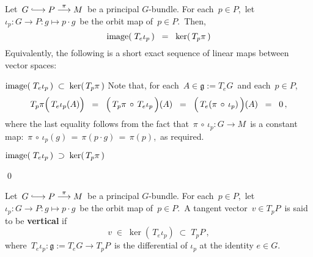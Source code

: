 
\vskip 0.5cm
\begin{proposition}
\mbox{}
\vskip 0.1cm
\noindent
Let \,$G \longhookrightarrow P \overset{\pi}{\longrightarrow} M$\, be a principal $G$-bundle.
For each \,$p \in P$,\, let \,$\iota_{p} : G \longrightarrow P : g \longmapsto p \cdot g$\, be the orbit map of \,$p \in P$.\,
Then,
\begin{equation*}
\textnormal{image}\!\left(\;T_{e}\iota_{p}\,\right) \;\; = \;\; \ker\!\left(\,T_{p}\pi\,\right)
\end{equation*}
Equivalently, the following is a short exact sequence of linear maps between vector spaces:
\begin{center}
\end{center}
\end{proposition}
\proof
\vskip 0.3cm
\noindent
\underline{$\textnormal{image}\!\left(\;T_{e}\iota_{p}\,\right) \;\subset\; \ker\!\left(\,T_{p}\pi\,\right)$}
\vskip 0.2cm
\noindent
Note that, for each \,$A \in \mathfrak{g} := T_{e}G$\, and each \,$p \in P$,\,
\begin{equation*}
T_{p}\pi\!\left(\,T_{e}\iota_{p}(\overset{{\color{white}.}}{A})\right)
\;\; = \;\;
	\left(\,T_{p}\pi \,\overset{{\color{white}1}}{\circ}\, T_{e}\iota_{p}\,\right)\!(A)
\;\; = \;\;
	\left(\,T_{e}(\pi\,\overset{{\color{white}1}}{\circ}\,\iota_{p})\,\right)\!(A)
\;\; = \;\;
	0\,,
\end{equation*}
where the last equality follows from the fact that
\,$\pi\,\circ\,\iota_{p} : G \longrightarrow M$\,
is a constant map:
\,$\pi\,\circ\,\iota_{p}(g) \,=\, \pi(p \cdot g) \,=\, \pi(p)$,\,
as required.

\vskip 0.3cm
\noindent
\underline{$\textnormal{image}\!\left(\;T_{e}\iota_{p}\,\right) \;\supset\; \ker\!\left(\,T_{p}\pi\,\right)$}
\vskip 0.2cm
\noindent


\qed


\vskip 0.5cm
\begin{definition}
\mbox{}
\vskip 0.1cm
\noindent
Let \,$G \longhookrightarrow P \overset{\pi}{\longrightarrow} M$\, be a principal $G$-bundle.
For each \,$p \in P$,\, let \,$\iota_{p} : G \longrightarrow P : g \longmapsto p \cdot g$\, be the orbit map of \,$p \in P$.\,
A tangent vector \,$v \in T_{p}P$\, is said to be \textbf{vertical} if
\begin{equation*}
v \;\in\; \ker\!\left(\,T_{e}\iota_{p}\right) \;\subset\; T_{p}P\,,
\end{equation*}
where \,$T_{e}\iota_{p} : \mathfrak{g} := T_{e}G \longrightarrow T_{p}P$\,
is the differential of $\iota_{p}$ at the identity $e \in G$.
\end{definition}



